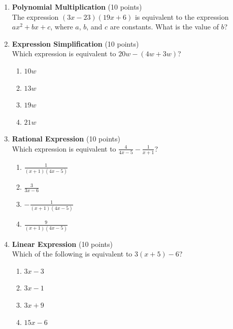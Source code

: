 \begin{enumerate}
  \item \textbf{Polynomial Multiplication} (10 points)\\
  The expression $(3x-23)(19x+6)$ is equivalent to the expression $ax^{2}+bx+c$, where $a$, $b$, and $c$ are constants. What is the value of $b$?
  \begin{subanswer}
  \end{subanswer}

  \item \textbf{Expression Simplification} (10 points)\\
  Which expression is equivalent to $20w-(4w+3w)$?
  \begin{enumerate}[label=(\Alph*)]
    \item $10w$
    \item $13w$
    \item $19w$
    \item $21w$
  \end{enumerate}
  \begin{subanswer}
  \end{subanswer}


  \newpage

  \item \textbf{Rational Expression} (10 points)\\
  Which expression is equivalent to $\frac{4}{4x-5}-\frac{1}{x+1}$?
  \begin{enumerate}[label=(\Alph*)]
    \item $\frac{1}{(x+1)(4x-5)}$
    \item $\frac{3}{3x-6}$
    \item $-\frac{1}{(x+1)(4x-5)}$
    \item $\frac{9}{(x+1)(4x-5)}$
  \end{enumerate}
  \begin{subanswer}
  \end{subanswer}

  \item \textbf{Linear Expression} (10 points)\\
  Which of the following is equivalent to $3(x+5)-6$?
  \begin{enumerate}[label=(\Alph*)]
    \item $3x-3$
    \item $3x-1$
    \item $3x+9$
    \item $15x-6$
  \end{enumerate}
  \begin{subanswer}
  \end{subanswer}


\end{enumerate}
